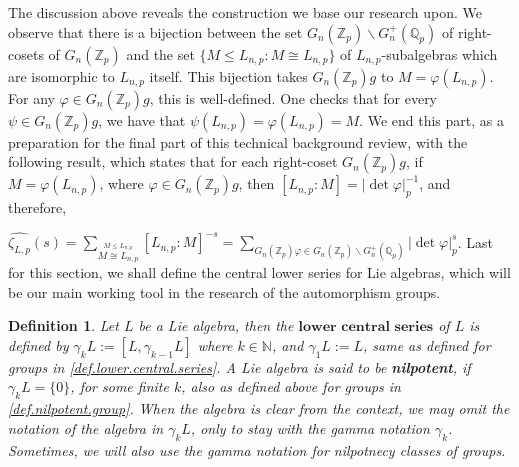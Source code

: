 \documentclass[12pt]{article}
\newtheorem{definition}[theorem]{Definition}
\begin{document}
The discussion above reveals the construction we base our research upon.
We observe that there is a bijection between the set $G_n(\mathbb{Z}_p)\backslash G^+_n(\mathbb{Q}_p)$ of right-cosets of $G_n(\mathbb{Z}_p)$ and the set $\{M\leq L_{n,p} : M\cong L_{n,p}\}$ of $L_{n,p}$-subalgebras which are isomorphic to $L_{n,p}$ itself. This bijection takes $G_n(\mathbb{Z}_p)g$ to $M=\varphi(L_{n,p})$. For any $\varphi\in G_n(\mathbb{Z}_p)g$, this is well-defined. One checks that for every $\psi\in G_n(\mathbb{Z}_p)g$, we have that $\psi(L_{n,p})=\varphi(L_{n,p})=M$.
We end this part, as a preparation for the final part of this technical background review, with the following result, which states that for each right-coset $G_n(\mathbb{Z}_p)g$, if $M=\varphi(L_{n,p})$, where $\varphi\in G_n(\mathbb{Z}_p)g$, then $[L_{n,p}:M]=|\det\varphi|_p^{-1}$, and therefore,\par $\hat{\zeta_{L,p}}(s)=\underset{\overset{\scriptscriptstyle M\leq L_{n,p}}{\scriptscriptstyle M\cong L_{n,p}}}{\sum}[L_{n,p}:M]^{-s}=\underset{\scriptscriptstyle G_n(\mathbb{Z}_p)\varphi\in G_n(\mathbb{Z}_p)\backslash G^+_n(\mathbb{Q}_p)}{\sum}|\det\varphi|_p^s$.
Last for this section, we shall define the central lower series for Lie algebras, which will be our main working tool in the research of the automorphism groups.
\begin{definition}
Let $L$ be a Lie algebra, then the $\textbf{lower central series}$ of $L$ is defined by $\gamma_k L:=[L,\gamma_{k-1}L]$ where $k\in\mathbb{N}$, and $\gamma_1 L:=L$, same as defined for groups in \ref{def.lower.central.series}. A Lie algebra is said to be \textbf{nilpotent}, if $\gamma_k L=\{0\}$, for some finite $k$, also as defined above for groups in \ref{def.nilpotent.group}. When the algebra is clear from the context, we may omit the notation of the algebra in $\gamma_k L$, only to stay with the gamma notation $\gamma_k$. Sometimes, we will also use the gamma notation for nilpotnecy classes of groups.
\end{definition}
\end{document}
